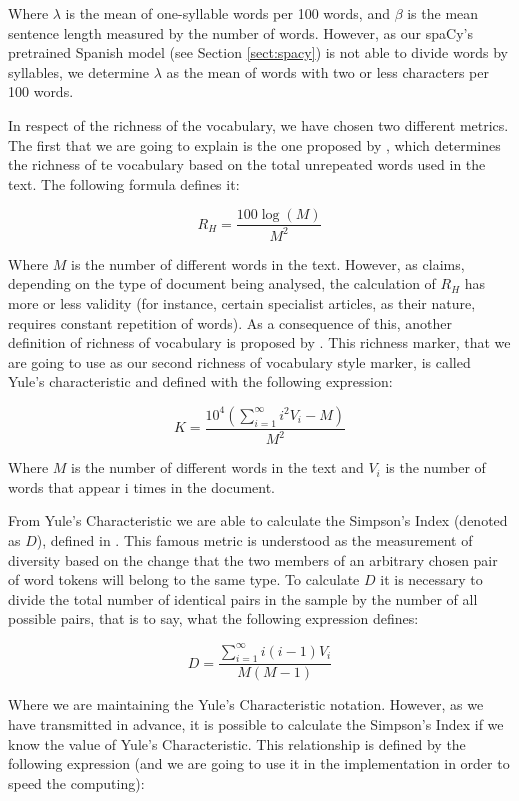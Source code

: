 Where $\lambda$ is the mean of one-syllable words per 100 words, and $\beta$ is the mean sentence length measured by the number of words. However, as our spaCy's pretrained Spanish model (see Section \ref{sect:spacy}) is not able to divide words by syllables, we determine $\lambda$ as the mean of words with two or less characters per 100 words.

In respect of the richness of the vocabulary, we have chosen two different metrics. The first that we are going to explain is the one proposed by \cite{honore1979some}, which determines the richness of te vocabulary based on the total unrepeated words used in the text. The following formula defines it:

$$
R_H = \frac{100\log(M)}{M^2}
$$

Where $M$ is the number of different words in the text. However, as \cite{ril2014determination} claims, depending on the type of document being analysed, the calculation of $R_H$ has more or less validity (for instance, certain specialist articles, as their nature, requires constant repetition of words). As a consequence of this, another definition of richness of vocabulary is proposed by \cite{yule2014statistical}. This richness marker, that we are going to use as our second richness of vocabulary style marker, is called Yule's characteristic and defined with the following expression:

$$
K = \frac{10^4\left(\sum_{i = 1}^\infty i^2V_i-M\right)}{M^2}
$$

Where $M$ is the number of different words in the text and $V_i$ is the number of words that appear i times in the document.

From Yule's Characteristic we are able to calculate the Simpson's Index (denoted as $D$), defined in \cite{simpson1949measurement}. This famous metric is understood as the measurement of diversity based on the change that the two members of an arbitrary chosen pair of word tokens will belong to the same type. To calculate $D$ it is necessary to divide the total number of identical pairs in the sample by the number of all possible pairs, that is to say, what the following expression defines:

$$
D = \frac{\sum_{i = 1}^\infty i(i-1)V_i}{M(M-1)}
$$

Where we are maintaining the Yule's Characteristic notation. However, as we have transmitted in advance, it is possible to calculate the Simpson's Index if we know the value of Yule's Characteristic. This relationship is defined by the following expression (and we are going to use it in the implementation in order to speed the computing):

